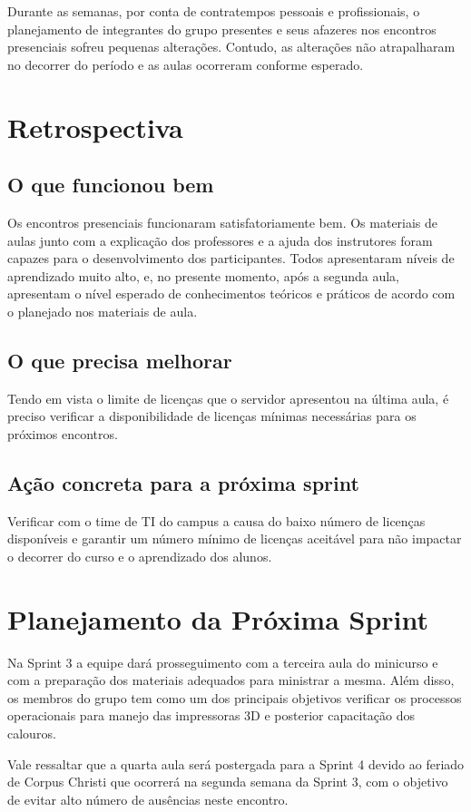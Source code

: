 \documentclass[12pt,a4paper]{article}
\begin{document}
Durante as semanas, por conta de contratempos pessoais e profissionais, o planejamento de integrantes do grupo presentes e seus afazeres nos encontros presenciais sofreu pequenas alterações. Contudo, as alterações não atrapalharam no decorrer do período e as aulas ocorreram conforme esperado.

\section{Retrospectiva}
\subsection*{O que funcionou bem}
Os encontros presenciais funcionaram satisfatoriamente bem. Os materiais de aulas junto com a explicação dos professores e a ajuda dos instrutores foram capazes para o desenvolvimento dos participantes. Todos apresentaram níveis de aprendizado muito alto, e, no presente momento, após a segunda aula, apresentam o nível esperado de conhecimentos teóricos e práticos de acordo com o planejado nos materiais de aula.

\subsection*{O que precisa melhorar}
Tendo em vista o limite de licenças que o servidor apresentou na última aula, é preciso verificar a disponibilidade de licenças mínimas necessárias para os próximos encontros.

\subsection*{Ação concreta para a próxima sprint}
Verificar com o time de TI do campus a causa do baixo número de licenças disponíveis e garantir um número mínimo de licenças aceitável para não impactar o decorrer do curso e o aprendizado dos alunos. 

\section{Planejamento da Próxima Sprint}
Na Sprint 3 a equipe dará prosseguimento com a terceira aula do minicurso e com a preparação dos materiais adequados para ministrar a mesma. Além disso, os membros do grupo tem como um dos principais objetivos verificar os processos operacionais para manejo das impressoras 3D e posterior capacitação dos calouros.

Vale ressaltar que a quarta aula será postergada para a Sprint 4 devido ao feriado de Corpus Christi que ocorrerá na segunda semana da Sprint 3, com o objetivo de evitar alto número de ausências neste encontro.
\end{document}
